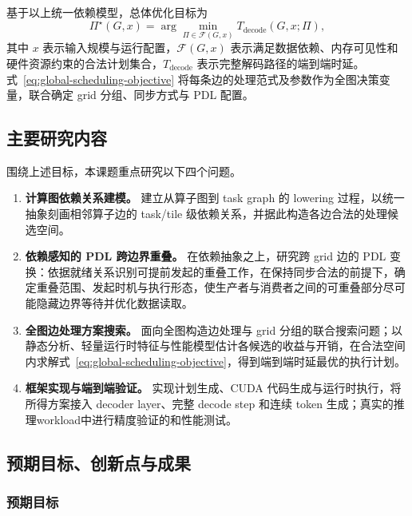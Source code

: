 % 

基于以上统一依赖模型，总体优化目标为
\begin{equation}
  \Pi^\star(G,x)
  =\arg\min_{\Pi\in\mathcal{F}(G,x)}
    T_{\mathrm{decode}}(G,x;\Pi),
  \label{eq:global-scheduling-objective}
\end{equation}
其中 $x$ 表示输入规模与运行配置，$\mathcal{F}(G,x)$ 表示满足数据依赖、内存可见性和硬件资源约束的合法计划集合，$T_{\mathrm{decode}}$ 表示完整解码路径的端到端时延。式~\eqref{eq:global-scheduling-objective} 将每条边的处理范式及参数作为全图决策变量，联合确定 grid 分组、同步方式与 PDL 配置。




\subsection{主要研究内容}

围绕上述目标，本课题重点研究以下四个问题。

\begin{enumerate}
  \item \textbf{计算图依赖关系建模。}
  建立从算子图到 task graph 的 lowering 过程，以统一抽象刻画相邻算子边的 task/tile 级依赖关系，并据此构造各边合法的处理候选空间。

  \item \textbf{依赖感知的 PDL 跨边界重叠。}
  在依赖抽象之上，研究跨 grid 边的 PDL 变换：依据就绪关系识别可提前发起的重叠工作，在保持同步合法的前提下，确定重叠范围、发起时机与执行形态，使生产者与消费者之间的可重叠部分尽可能隐藏边界等待并优化数据读取。

  \item \textbf{全图边处理方案搜索。}
  面向全图构造边处理与 grid 分组的联合搜索问题；以静态分析、轻量运行时特征与性能模型估计各候选的收益与开销，在合法空间内求解式~\eqref{eq:global-scheduling-objective}，得到端到端时延最优的执行计划。

  \item \textbf{框架实现与端到端验证。}
  实现计划生成、CUDA 代码生成与运行时执行，将所得方案接入 decoder layer、完整 decode step 和连续 token 生成；真实的推理workload中进行精度验证的和性能测试。
\end{enumerate}

\subsection{预期目标、创新点与成果}

\subsubsection{预期目标}

